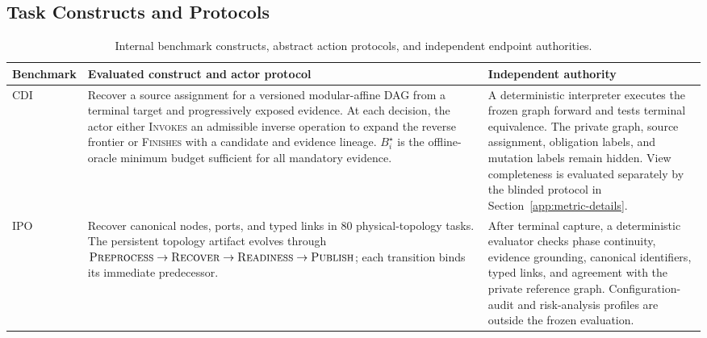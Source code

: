 \subsection{Task Constructs and Protocols}
\begin{table}[H]
\centering
\normalsize
\renewcommand{\arraystretch}{1.16}
\caption{Internal benchmark constructs, abstract action protocols, and independent endpoint authorities.}
\label{tab:benchmark-constructs}
\begin{tabularx}{0.95\textwidth}{@{}p{} X X@{}}
\toprule
\textbf{Benchmark} & \textbf{Evaluated construct and actor protocol} & \textbf{Independent authority} \\
\midrule
CDI & Recover a source assignment for a versioned modular-affine DAG from a terminal target and progressively exposed evidence. At each decision, the actor either \textsc{Invokes} an admissible inverse operation to expand the reverse frontier or \textsc{Finishes} with a candidate and evidence lineage. $B_i^\star$ is the offline-oracle minimum budget sufficient for all mandatory evidence. & A deterministic interpreter executes the frozen graph forward and tests terminal equivalence. The private graph, source assignment, obligation labels, and mutation labels remain hidden. View completeness is evaluated separately by the blinded protocol in Section~\ref{app:metric-details}. \\
IPO & Recover canonical nodes, ports, and typed links in 80 physical-topology tasks. The persistent topology artifact evolves through
$\textsc{Preprocess}\to\textsc{Recover}\to\textsc{Readiness}\to\textsc{Publish}$;
each transition binds its immediate predecessor. & After terminal capture, a deterministic evaluator checks phase continuity, evidence grounding, canonical identifiers, typed links, and agreement with the private reference graph. Configuration-audit and risk-analysis profiles are outside the frozen evaluation. \\
\bottomrule
\end{tabularx}
\end{table}
